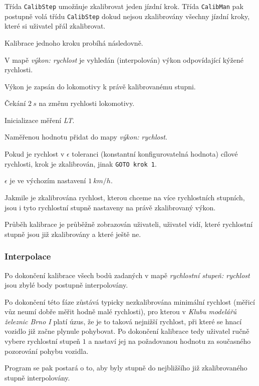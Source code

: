 Třída \texttt{CalibStep} umožňuje zkalibrovat jeden jízdní krok. Třída
\texttt{CalibMan} pak postupně volá třídu \texttt{CalibStep} dokud nejsou
zkalibrovány všechny jízdní kroky, které si uživatel přál zkalibrovat.

Kalibrace jednoho kroku probíhá následovně.

\begin{compactenum}
\item V mapě \textit{výkon: rychlost} je vyhledán (interpolován) výkon odpovídající
      kýžené rychlosti.
\item Výkon je zapsán do lokomotivy k právě kalibrovanému stupni.
\item Čekání $2\ s$ na změnu rychlosti lokomotivy.
\item Inicializace měření \textit{LT}.
\item Naměřenou hodnotu přidat do mapy \textit{výkon: rychlost}.
\item Pokud je rychlost v $\epsilon$ toleranci (konstantní konfigurovatelná hodnota)
      cílové rychlosti, krok je zkalibrován, jinak \texttt{GOTO krok 1}.
\end{compactenum}

$\epsilon$ je ve výchozím nastavení $1\ km/h$.

Jakmile je zkalibrována rychlost, kterou chceme na více rychlostních stupních,
jsou i tyto rychlostní stupně nastaveny na právě zkalibrovaný výkon.

Průběh kalibrace je průběžně zobrazován uživateli, uživatel vidí, které rychlostní
stupně jsou již zkalibrovány a které ještě ne.

\subsubsection{Interpolace}

Po dokončení kalibrace všech bodů zadaných v mapě \textit{rychlostní stupeň:
rychlost} jsou zbylé body postupně interpolovány.

Po dokončení této fáze zůstává typicky nezkalibrována minimální rychlost
(měřicí vůz neumí dobře měřit hodně malé rychlosti), pro kterou v \textit{Klubu
modelářů železnic Brno I} platí úzus, že je to taková nejnižší rychlost, při
které se hnací vozidlo již začne plynule pohybovat.  Po dokončení kalibrace
tedy uživatel ručně vybere rychlostní stupeň $1$ a nastaví jej na požadovanou
hodnotu za současného pozorování pohybu vozidla.

Program se pak postará o to, aby byly stupně do nejbližšího již zkalibrovaného
stupně interpolovány.

